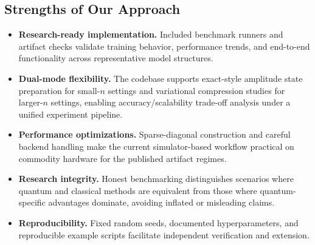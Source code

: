 \documentclass[conference,10pt]{IEEEtran}
\begin{document}
\subsection{Strengths of Our Approach}
\begin{itemize}[leftmargin=*, topsep=0pt, partopsep=0pt, itemsep=2pt, parsep=0pt]
    \item \textbf{Research-ready implementation.} Included benchmark runners and artifact checks validate training behavior, performance trends, and end-to-end functionality across representative model structures.
    \item \textbf{Dual-mode flexibility.} The codebase supports exact-style amplitude state preparation for small-$n$ settings and variational compression studies for larger-$n$ settings, enabling accuracy/scalability trade-off analysis under a unified experiment pipeline.
    \item \textbf{Performance optimizations.} Sparse-diagonal construction and careful backend handling make the current simulator-based workflow practical on commodity hardware for the published artifact regimes.
    \item \textbf{Research integrity.} Honest benchmarking distinguishes scenarios where quantum and classical methods are equivalent from those where quantum-specific advantages dominate, avoiding inflated or misleading claims.
    \item \textbf{Reproducibility.} Fixed random seeds, documented hyperparameters, and reproducible example scripts facilitate independent verification and extension.
\end{itemize}
\end{document}
